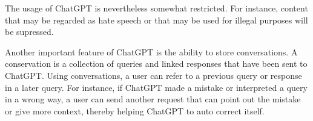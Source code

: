 The usage of ChatGPT is nevertheless somewhat restricted. For instance, content that may be regarded as hate speech or that may be used for illegal purposes will be supressed.

Another important feature of ChatGPT is the ability to store conversations. A conservation is a collection of queries and linked responses that have been sent to ChatGPT. Using conversations, a user can refer to a previous query or response in a later query. For instance, if ChatGPT made a mistake or interpreted a query in a wrong way, a user can send another request that can point out the mistake or give more context, thereby helping ChatGPT to auto correct itself. 
